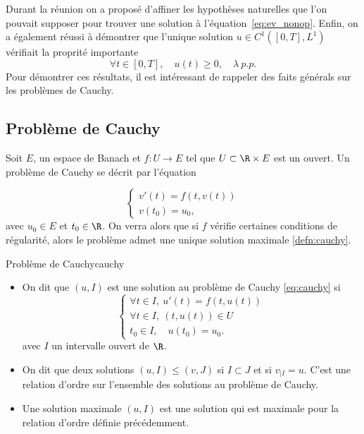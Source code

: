 Durant la réunion on a proposé d'affiner les hypothèses naturelles que l'on pouvait supposer
pour trouver une solution à l'équation~\ref{eq:ev_nonop}. Enfin, on a également réussi à démontrer
que l'unique solution $u \in C^1([0,T], L^1)$ vérifiait la proprité importante
\[
	\forall t \in [0,T], \quad u(t) \ge 0,\quad \lambda\ p.p.
\]
Pour démontrer ces résultats, il est intéressant de rappeler des faits générals sur les problèmes de
Cauchy.

\subsection{Problème de Cauchy}

Soit $E$, un espace de Banach et $f : U \to E$ tel que $U \subset \R \times E$ est un ouvert. Un problème de Cauchy
se décrit par l'équation

\begin{equation}
	\begin{cases}
		v'(t) = f(t,v(t)) \\
		v(t_0) = u_0,
	\end{cases}
	\label{eq:cauchy}
\end{equation}
avec $u_0 \in E$ et $t_0 \in \R$. On verra alors que si $f$ vérifie certaines conditions de régularité,
alors le problème admet une unique solution maximale \ref{defn:cauchy}.

\begin{defn}{Problème de Cauchy}{cauchy}
	\begin{itemize}
		\item On dit que $(u,I)$ est une solution au problème de Cauchy \ref{eq:cauchy} si
		      \[
			      \begin{cases}
				      \forall t \in I, \ u'(t) = f(t,u(t)) \\
				      \forall t \in I, \ (t,u(t)) \in U    \\
				      t_0 \in I, \quad u(t_0) = u_0.
			      \end{cases}
		      \]
		      avec $I$ un intervalle ouvert de $\R$.
		\item On dit que deux solutions $(u, I) \le (v,J)$ si $I \subset J$ et si $v_{|I} = u$. C'est une relation d'ordre sur l'ensemble
		      des solutions au problème de Cauchy.
		\item Une solution maximale $(u,I)$ est une solution qui est maximale pour la relation d'ordre définie précédemment.
	\end{itemize}
\end{defn}

